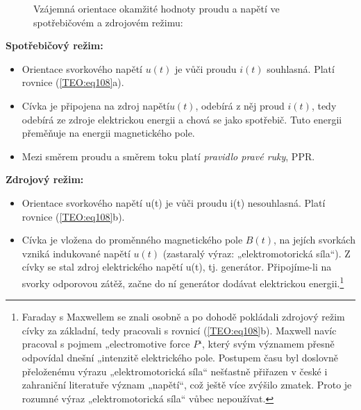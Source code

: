     \begin{figure}[ht!]
      \centering  
      \newline               
      \caption{Vzájemná orientace okamžité hodnoty proudu a napětí ve spotřebičovém a zdrojovém 
               režimu:} 
      \label{teo:fig039}
    \end{figure}
        
    \textbf{Spotřebičový režim:}
    \begin{itemize}[noitemsep]
      \item Orientace svorkového napětí \(u(t)\) je vůči proudu \(i(t)\) souhlasná. Platí rovnice
            (\ref{TEO:eq108}a).
      \item Cívka je připojena na zdroj napětí\(u(t)\), odebírá z něj proud \(i(t)\), tedy odebírá
            ze zdroje elektrickou energii a chová se jako spotřebič. Tuto energii přeměňuje na
            energii magnetického pole.
      \item Mezi směrem proudu a směrem toku platí \emph{pravidlo pravé ruky}, PPR.           
    \end{itemize}
    
    \textbf{Zdrojový režim:}
    \begin{itemize}[noitemsep]
      \item Orientace svorkového napětí u(t) je vůči proudu i(t) nesouhlasná. Platí rovnice
            (\ref{TEO:eq108}b).
      \item Cívka je vložena do proměnného magnetického pole \(B(t)\), na jejích svorkách vzniká
            indukované napětí \(u(t)\) (zastaralý výraz: „elektromotorická síla“). Z cívky se stal
            zdroj elektrického napětí u(t), tj. generátor. Připojíme-li na svorky odporovou zátěž,
            začne do ní generátor dodávat elektrickou energii.\footnote{Faraday s Maxwellem se
            znali osobně a po dohodě pokládali zdrojový režim cívky za základní, tedy pracovali s
            rovnicí (\ref{TEO:eq108}b). Maxwell navíc pracoval s pojmem „electromotive force
            \(P\)‘, který svým významem přesně odpovídal dnešní „intenzitě elektrického pole.
            Postupem času byl doslovně přeloženému výrazu „elektromotorická síla“ nešťastně
            přiřazen v české i zahraniční literatuře význam „napětí“, což ještě více zvýšilo
            zmatek. Proto je rozumné výraz „elektromotorická síla“ vůbec nepoužívat.}
    \end{itemize}


